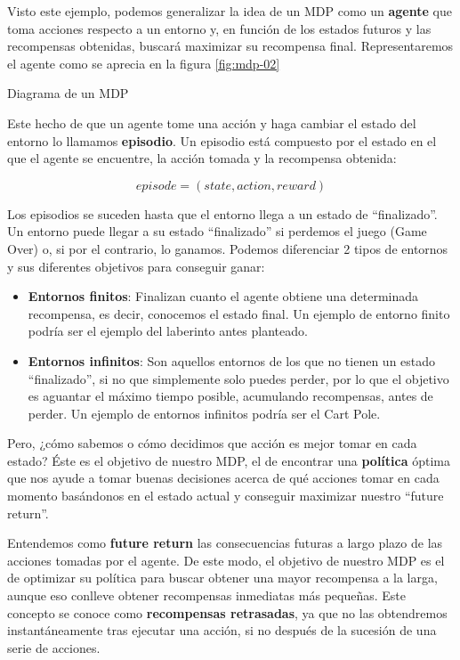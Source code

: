 
Visto este ejemplo, podemos generalizar la idea de un MDP como un \textbf{agente} que toma acciones respecto a un entorno y, en función de los estados futuros y las recompensas obtenidas, buscará maximizar su recompensa final. Representaremos el agente como se aprecia en la figura \ref{fig:mdp-02}

%
      {Diagrama de un MDP}

Este hecho de que un agente tome una acción y haga cambiar el estado del entorno lo llamamos \textbf{episodio}. Un episodio está compuesto por el estado en el que el agente se encuentre, la acción tomada y la recompensa obtenida:

\begin{equation}
    episode = (state, action, reward)
\end{equation}

Los episodios se suceden hasta que el entorno llega a un estado de “finalizado”. Un entorno puede llegar a su estado “finalizado” si perdemos el juego (Game Over) o, si por el contrario, lo ganamos. Podemos diferenciar 2 tipos de entornos y sus diferentes objetivos para conseguir ganar:

\begin{itemize}
    \item \textbf{Entornos finitos}: Finalizan cuanto el agente obtiene una determinada recompensa, es decir, conocemos el estado final. Un ejemplo de entorno finito podría ser el ejemplo del laberinto antes planteado.
    \item \textbf{Entornos infinitos}: Son aquellos entornos de los que no tienen un estado “finalizado”, si no que simplemente solo puedes perder, por lo que el objetivo es aguantar el máximo tiempo posible, acumulando recompensas, antes de perder. Un ejemplo de entornos infinitos podría ser el Cart Pole.
\end{itemize}

Pero, ¿cómo sabemos o cómo decidimos que acción es mejor tomar en cada estado? Éste es el objetivo de nuestro MDP, el de encontrar una \textbf{política} óptima que nos ayude a tomar buenas decisiones acerca de qué acciones tomar en cada momento basándonos en el estado actual y conseguir maximizar nuestro “future return”.

Entendemos como \textbf{future return} las consecuencias futuras a largo plazo de las acciones tomadas por el agente. De este modo, el objetivo de nuestro MDP es el de optimizar su política para buscar obtener una mayor recompensa a la larga, aunque eso conlleve obtener recompensas inmediatas más pequeñas. Este concepto se conoce como \textbf{recompensas retrasadas}, ya que no las obtendremos instantáneamente tras ejecutar una acción, si no después de la sucesión de una serie de acciones.

